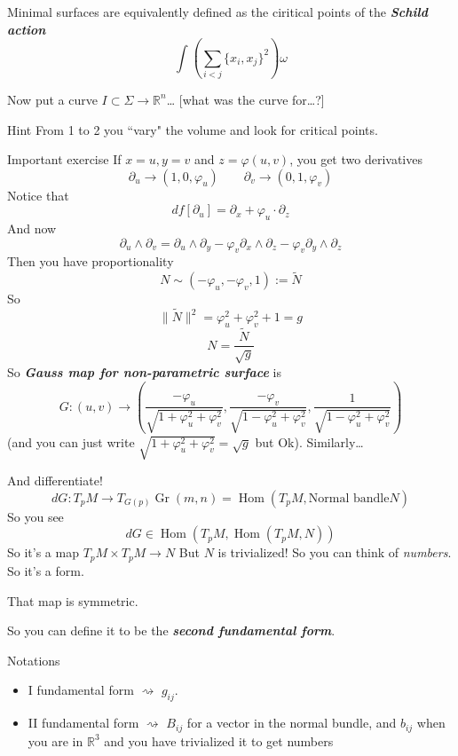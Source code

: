 \begin{claim}\leavevmode
Minimal surfaces are equivalently defined as the ciritical points of the \textit{\textbf{Schild action}} 
\[\int \left(\sum_{i<j}\{x_i,x_j\}^2\right)\omega\]

\end{claim}
Now put a curve \(I \subset \Sigma \to \mathbb{R}^n\)… [what was the curve for…?]

\begin{thing7}{Hint}\leavevmode
From 1 to 2 you ``vary" the volume and look for critical points.
\end{thing7}

\begin{thing6}{Important exercise}\leavevmode
If \(x=u,y=v\) and \(z=\varphi(u,v)\), you get two derivatives
\[\partial_u \to (1,0,\varphi_u)\qquad \partial_v \to (0,1,\varphi_v)\]
Notice that
\[df[\partial_u]=\partial_x+\varphi_u\cdot \partial_z\]
And now
\[\partial_u \wedge \partial_v = \partial_u \wedge \partial_y- \varphi_v\partial_x \wedge\partial_z-\varphi_v \partial_y \wedge \partial_z\]
Then you have proportionality
\[N \sim (-\varphi_u,-\varphi_v,1):=\tilde{N}\]
So
\[\|\tilde{N}\|^2=\varphi_u^2+\varphi_v^2+1=g\]
\[N=\frac{\tilde{N}}{\sqrt{g} }\]
So \textit{\textbf{Gauss map for non-parametric surface}} is 
\[G:(u,v) \longrightarrow\left(\frac{-\varphi_u}{\sqrt{1+\varphi^2_u+\varphi^2_v} },\frac{-\varphi_v}{\sqrt{1-\varphi^2_u+\varphi^2_v} },\frac{1}{\sqrt{1-\varphi_u^2+\varphi_v^2} }\right) \]
(and you can just write \(\sqrt{1+\varphi_u^2+\varphi_v^2} =\sqrt{g} \) but Ok). Similarly…
\end{thing6}

And differentiate!
\[dG:T_pM \to T_{G(p)}\operatorname{Gr}(m,n)=\operatorname{Hom}(T_pM,\text{Normal bandle}N )\]
So you see
\[dG \in \operatorname{Hom}(T_pM,\operatorname{Hom}(T_pM, N))\]
So it's a map
\(T_pM \times T_pM \to N\) 
But \(N\) is trivialized! So you can think of  \textit{numbers}. So it's a form.

\begin{claim}\leavevmode
That map is symmetric.
\end{claim}
So you can define it to be the \textit{\textbf{second fundamental form}}.


\begin{thing8}{Notations}\leavevmode
\begin{itemize}
\item I fundamental form \(\rightsquigarrow \) \(g_{ij}\).
\item  II fundamental form \(\rightsquigarrow \) \(B_{ij}\) for a vector in the normal bundle, and \(b_{ij}\) when you are in \(\mathbb{R}^3\) and you have trivialized it to get numbers
\end{itemize}
\end{thing8}

